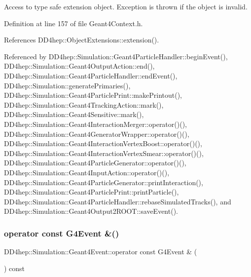 Access to type safe extension object. Exception is thrown if the object is invalid. 



Definition at line 157 of file Geant4\+Context.\+h.



References D\+D4hep\+::\+Object\+Extensions\+::extension().



Referenced by D\+D4hep\+::\+Simulation\+::\+Geant4\+Particle\+Handler\+::begin\+Event(), D\+D4hep\+::\+Simulation\+::\+Geant4\+Output\+Action\+::end(), D\+D4hep\+::\+Simulation\+::\+Geant4\+Particle\+Handler\+::end\+Event(), D\+D4hep\+::\+Simulation\+::generate\+Primaries(), D\+D4hep\+::\+Simulation\+::\+Geant4\+Particle\+Print\+::make\+Printout(), D\+D4hep\+::\+Simulation\+::\+Geant4\+Tracking\+Action\+::mark(), D\+D4hep\+::\+Simulation\+::\+Geant4\+Sensitive\+::mark(), D\+D4hep\+::\+Simulation\+::\+Geant4\+Interaction\+Merger\+::operator()(), D\+D4hep\+::\+Simulation\+::\+Geant4\+Generator\+Wrapper\+::operator()(), D\+D4hep\+::\+Simulation\+::\+Geant4\+Interaction\+Vertex\+Boost\+::operator()(), D\+D4hep\+::\+Simulation\+::\+Geant4\+Interaction\+Vertex\+Smear\+::operator()(), D\+D4hep\+::\+Simulation\+::\+Geant4\+Particle\+Generator\+::operator()(), D\+D4hep\+::\+Simulation\+::\+Geant4\+Input\+Action\+::operator()(), D\+D4hep\+::\+Simulation\+::\+Geant4\+Particle\+Generator\+::print\+Interaction(), D\+D4hep\+::\+Simulation\+::\+Geant4\+Particle\+Print\+::print\+Particle(), D\+D4hep\+::\+Simulation\+::\+Geant4\+Particle\+Handler\+::rebase\+Simulated\+Tracks(), and D\+D4hep\+::\+Simulation\+::\+Geant4\+Output2\+R\+O\+O\+T\+::save\+Event().

\hypertarget{class_d_d4hep_1_1_simulation_1_1_geant4_event_a6212af49c30342d4c53be4abf94d6205}{}\label{class_d_d4hep_1_1_simulation_1_1_geant4_event_a6212af49c30342d4c53be4abf94d6205} 
\subsubsection{\texorpdfstring{operator const G4\+Event \&()}{operator const G4Event \&()}}
{\footnotesize\ttfamily D\+D4hep\+::\+Simulation\+::\+Geant4\+Event\+::operator const G4\+Event \& (\begin{DoxyParamCaption}{ }\end{DoxyParamCaption}) const\hspace{0.3cm}{\ttfamily [inline]}}



